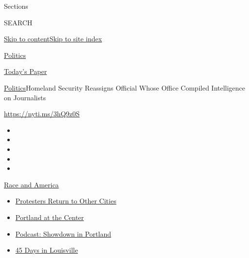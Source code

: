 Sections

SEARCH

\protect\hyperlink{site-content}{Skip to
content}\protect\hyperlink{site-index}{Skip to site index}

\href{https://www.nytimes.com/section/politics}{Politics}

\href{https://myaccount.nytimes.com/auth/login?response_type=cookie\&client_id=vi}{}

\href{https://www.nytimes.com/section/todayspaper}{Today's Paper}

\href{/section/politics}{Politics}\textbar{}Homeland Security Reassigns
Official Whose Office Compiled Intelligence on Journalists

\url{https://nyti.ms/3hQ9z0S}

\begin{itemize}
\item
\item
\item
\item
\item
\end{itemize}

\href{https://www.nytimes.com/news-event/george-floyd-protests-minneapolis-new-york-los-angeles?action=click\&pgtype=Article\&state=default\&region=TOP_BANNER\&context=storylines_menu}{Race
and America}

\begin{itemize}
\tightlist
\item
  \href{https://www.nytimes.com/2020/07/26/us/protests-portland-seattle-trump.html?action=click\&pgtype=Article\&state=default\&region=TOP_BANNER\&context=storylines_menu}{Protesters
  Return to Other Cities}
\item
  \href{https://www.nytimes.com/2020/07/24/us/portland-oregon-protests-white-race.html?action=click\&pgtype=Article\&state=default\&region=TOP_BANNER\&context=storylines_menu}{Portland
  at the Center}
\item
  \href{https://www.nytimes.com/2020/07/23/podcasts/the-daily/portland-protests.html?action=click\&pgtype=Article\&state=default\&region=TOP_BANNER\&context=storylines_menu}{Podcast:
  Showdown in Portland}
\item
  \href{https://www.nytimes.com/interactive/2020/07/16/us/black-lives-matter-protests-louisville-breonna-taylor.html?action=click\&pgtype=Article\&state=default\&region=TOP_BANNER\&context=storylines_menu}{45
  Days in Louisville}
\end{itemize}

